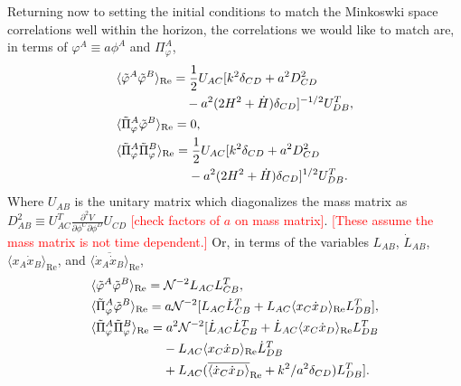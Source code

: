 Returning now to setting the initial conditions to match the Minkoswki space correlations well within the horizon, the correlations we would like to match are, in terms of $\varphi^A \equiv a\phi^A$ and $\Pi_\varphi^A$, 
\begin{align}
  & \langle\tilde{\varphi}^A\tilde{\varphi}^B\rangle_\mathrm{Re} = \frac{1}{2}U_{AC}[k^2\delta_{CD} + a^2D^2_{CD} \nonumber \\
    & \hphantom{\langle\tilde{\varphi}^A\tilde{\varphi}^B\rangle_\mathrm{Re} =}- a^2(2H^2 + \dot{H})\delta_{CD}]^{-1/2}U_{DB}^T, \label{eq:mink corr ff 1} \\
  & \langle\tilde{\Pi}_\varphi^A\tilde{\varphi}^B\rangle_\mathrm{Re} = 0, \label{eq:mink corr fdf 1} \\
  & \langle\tilde{\Pi}_\varphi^A\tilde{\Pi}_\varphi^B\rangle_\mathrm{Re} = \frac{1}{2}U_{AC}[k^2\delta_{CD} + a^2D^2_{CD} \nonumber \\
    & \hphantom{\langle\tilde{\Pi}_\varphi^A\tilde{\Pi}_\varphi^B\rangle_\mathrm{Re} =}- a^2(2H^2 + \dot{H})\delta_{CD}]^{1/2}U_{DB}^T. \label{eq:mink corr dfdf 1}
\end{align}
Where $U_{AB}$ is the unitary matrix which diagonalizes the mass matrix as $D^2_{AB} \equiv U_{AC}^T\frac{\partial^2V}{\partial\phi^C\partial\phi^D}U_{CD}$ \textcolor{red}{[check factors of $a$ on mass matrix]}. \textcolor{red}{[These assume the mass matrix is not time dependent.]}
Or, in terms of the variables $L_{AB}$, $\dot{L}_{AB}$, $\langle x_A\dot{x}_B \rangle_\mathrm{Re}$, and $\overline{\langle \dot{x}_A\dot{x}_B \rangle}_\mathrm{Re}$,
\begin{align}
  & \langle\tilde{\varphi}^A\tilde{\varphi}^B\rangle_\mathrm{Re} = \mathcal{N}^{-2}L_{AC}L_{CB}^T, \label{eq:mink corr ff 2} \\
  & \langle\tilde{\Pi}_\varphi^A\tilde{\varphi}^B\rangle_\mathrm{Re} = a\mathcal{N}^{-2}[L_{AC}\dot{L}_{CB}^T + L_{AC}\langle x_C\dot{x}_D\rangle_\mathrm{Re}L_{DB}^T], \label{eq:mink corr fdf 2}\\
  & \langle\tilde{\Pi}_\varphi^A\tilde{\Pi}_\varphi^B\rangle_\mathrm{Re} = a^2\mathcal{N}^{-2}[\dot{L}_{AC}\dot{L}_{CB}^T + \dot{L}_{AC}\langle x_C\dot{x}_D\rangle_\mathrm{Re}L_{DB}^T \nonumber \\
    & \hphantom{\langle\tilde{\Pi}_\varphi^A\tilde{\Pi}_\varphi^B\rangle_\mathrm{Re} =} - L_{AC}\langle x_C\dot{x}_D\rangle_\mathrm{Re}\dot{L}_{DB}^T \nonumber \\
    & \hphantom{\langle\tilde{\Pi}_\varphi^A\tilde{\Pi}_\varphi^B\rangle_\mathrm{Re} =} + L_{AC}(\overline{\langle \dot{x}_C\dot{x}_D\rangle}_\mathrm{Re} + k^2/a^2\delta_{CD})L_{DB}^T]. \label{eq:mink corr dfdf 2}
\end{align}

